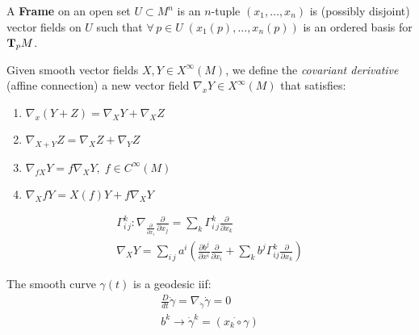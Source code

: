 \documentclass{beamer}
\begin{document}
\begin{frame}
\begin{ddef}
A \textbf{Frame} on an open set $U\subset M^n$ is an $n$-tuple $(x_1,\ldots, x_n)$ is (possibly disjoint) vector fields on $U$ such that $\forall \, p\in U\; (x_1(p),\ldots, x_n(p))$ is an ordered basis for $\text{\textbf{T}}_p M$.
\end{ddef}
\begin{ddef}
    Given smooth vector fields $X,Y\in X^\infty(M)$, we define the \emph{covariant derivative} (affine connection) a new vector field $\nabla_xY \in X^\infty(M) $ that satisfies:
    \begin{enumerate}
        \item $\nabla_x(Y+Z) = \nabla_X Y + \nabla_XZ$
        \item $\nabla_{X+Y} Z = \nabla_X Z + \nabla_Y Z $
        \item $\nabla_{fX}Y = f\nabla_XY,\; f\in C^\infty(M)$
        \item $\nabla_X fY = X(f) Y + f\nabla_XY$
    \end{enumerate}
\end{ddef}
    \begin{ddef}
        \begin{gather*}
            \Gamma_{i\,j}^k: \nabla_{ \frac{\partial}{\partial x_i}} \frac{\partial}{\partial x_j} = \sum_k \Gamma_{i\,j}^k  \frac{\partial}{\partial x_k}\\
            \nabla_X Y = \sum_{i\, j} a^i\left(  \frac{\partial b^j}{\partial x^i}  \frac{\partial}{\partial x_i} + \sum_k b^j \Gamma_{ij}^k  \frac{\partial}{\partial x_k}\right)
        \end{gather*}
    \end{ddef}
    \begin{ddef}
        The smooth curve $\gamma(t)$ is a geodesic iif:
        \begin{gather*}
            \frac{D}{dt} \dot \gamma = \nabla_{\dot \gamma} \dot \gamma =0\\
            b^k \longrightarrow \dot \gamma^k = (\dot{x_k\circ \gamma})
        \end{gather*}
    \end{ddef}
\end{frame}
\begin{frame}
\end{frame}
\end{document}
